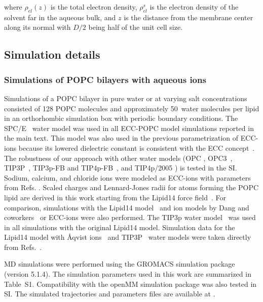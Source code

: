 \documentclass[aip,jcp,twocolumn]{revtex4}
\begin{document}
\noindent where $\rho_{el} (z)$ is the total electron density, $\rho_{el}^s$ is the electron density of the solvent far in the aqueous bulk, and $z$ is the distance from the membrane center along its normal with $D/2$ being half of the unit cell size.  




\subsection{Simulation details}

\subsubsection{Simulations of POPC bilayers with aqueous ions}
Simulations of a POPC bilayer in pure water or at varying salt concentrations consisted of 128 POPC molecules
and approximately 50~water molecules per lipid in an orthorhombic simulation box with periodic boundary conditions.
The SPC/E~\cite{Berendsen1987} water model was used in all ECC-POPC model simulations reported
in the main text. This model was also used in the previous parametrization
of ECC-ions \cite{martinek17, kohagen16, Pluharova2014} because its lowered dielectric constant is consistent with
the ECC concept~\cite{leontyev11, leontyev14}.
The robustness of our approach with other water models (OPC \cite{Izadi14},
OPC3~\cite{Izadi16}, TIP3P~\cite{jorgensen83}, TIP3p-FB and TIP4p-FB~\cite{Wang2014}, and TIP4p/2005 \cite{Abascal2005})
is tested in the SI.
Sodium, calcium, and chloride ions were modeled as ECC-ions
with parameters from Refs. . Scaled charges and Lennard-Jones radii for atoms
forming the POPC lipid are derived in this work starting from the Lipid14 force field~\cite{dickson14}.
For comparison, simulations with the Lipid14 model~\cite{dickson14} and
ion models by Dang and coworkers~\cite{smith94,chang1999,dang2006} or ECC-ions \cite{martinek17, kohagen16, Pluharova2014}
were also performed. The TIP3p water model~\cite{jorgensen83} was used in all simulations with the original Lipid14 model.
Simulation data for the Lipid14 model with \AA{}qvist ions~\cite{aqvist90} and TIP3P~\cite{jorgensen83} water models were taken directly from
Refs.~.  

MD simulations were performed using the GROMACS \cite{Abraham15} simulation package (version 5.1.4). The simulation parameters used
in this work are summarized in Table~S1. 
Compatibility with the openMM simulation package \cite{openmm7} was also
tested in SI. 
The simulated trajectories and parameters files are available at \cite{??} .
\end{document}
